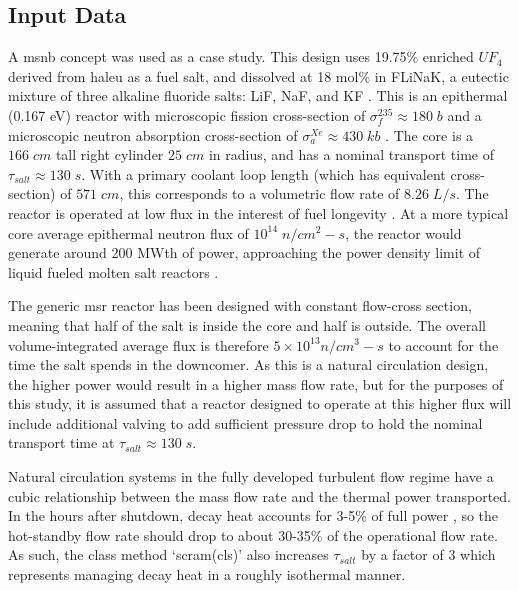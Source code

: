 \subsection{Input Data}
A \acs{msnb} concept was used as a case study. This design uses 19.75\% enriched $UF_4$ derived from \acf{haleu} as a fuel salt, and dissolved at 18 mol\% in FLiNaK, a eutectic mixture of three alkaline fluoride salts: LiF, NaF, and KF \cite{CarterNumerical}. This is an epithermal (0.167 eV) reactor with microscopic fission cross-section of $\sigma_{f}^{235}\approx 180\; b$ and a microscopic \Xe neutron absorption cross-section of $\sigma_{a}^{Xe}\approx 430\; kb$ \cite{TENDL}. The core is a $166\; cm$ tall right cylinder $25\; cm$ in radius, and has a nominal transport time of $\tau_{salt} \approx 130\; s$. With a primary coolant loop length (which has equivalent cross-section) of $571\; cm$, this corresponds to a volumetric flow rate of $8.26 \; L/s$. The reactor is operated at low flux in the interest of fuel longevity \cite{CarterNumerical}.  At a more typical core average epithermal neutron flux of $10^{14} \; n/cm^{2}-s$, the reactor would generate around 200 MWth of power, approaching the power density limit of liquid fueled molten salt reactors \cite{PowerDensity}. 

The generic \acs{msr} reactor has been designed with constant flow-cross section, meaning that half of the salt is inside the core and half is outside. The overall volume-integrated average flux is therefore $5\times 10^{13} n/cm^3-s$ to account for the time the salt spends in the downcomer. As this is a natural circulation design, the higher power would result in a higher mass flow rate, but for the purposes of this study, it is assumed that a reactor designed to operate at this higher flux will include additional valving to add sufficient pressure drop to hold the nominal transport time at $\tau_{salt} \approx 130\; s$.

Natural circulation systems in the fully developed turbulent flow regime have a cubic relationship between the mass flow rate and the thermal power transported\cite[Ch. 3]{TodreasKazimi2}. In the hours after shutdown, decay heat accounts for 3-5\% of full power \cite[Ch. 3]{TodreasKazimi1}, so the hot-standby flow rate should drop to about 30-35\% of the operational flow rate. As such, the class method `scram(cls)' also increases $\tau_{salt}$ by a factor of 3 which represents managing decay heat in a roughly isothermal manner.



